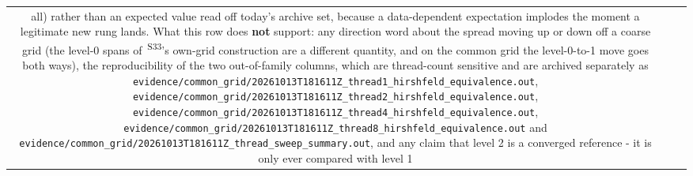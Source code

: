 \documentclass[11pt]{article}
\newcommand{\prov}[1]{\textsuperscript{\,#1}}
\begin{document}
\begin{longtable}{c>{\raggedright\arraybackslash}p{}>{\raggedright\arraybackslash}p{}}
all) rather than an expected value read off today's archive set, because a data-dependent expectation implodes the moment a legitimate new rung lands. What this row does \textbf{not} support: any direction word about the spread moving up or down off a coarse grid (the level-0 spans of \prov{S33}'s own-grid construction are a different quantity, and on the common grid the level-0-to-1 move goes both ways), the reproducibility of the two out-of-family columns, which are thread-count sensitive and are archived separately as \texttt{evidence/\allowbreak{}common\_\allowbreak{}grid/\allowbreak{}20261013T181611Z\_\allowbreak{}thread1\_\allowbreak{}hirshfeld\_\allowbreak{}equivalence.out}, \texttt{evidence/\allowbreak{}common\_\allowbreak{}grid/\allowbreak{}20261013T181611Z\_\allowbreak{}thread2\_\allowbreak{}hirshfeld\_\allowbreak{}equivalence.out}, \texttt{evidence/\allowbreak{}common\_\allowbreak{}grid/\allowbreak{}20261013T181611Z\_\allowbreak{}thread4\_\allowbreak{}hirshfeld\_\allowbreak{}equivalence.out}, \texttt{evidence/\allowbreak{}common\_\allowbreak{}grid/\allowbreak{}20261013T181611Z\_\allowbreak{}thread8\_\allowbreak{}hirshfeld\_\allowbreak{}equivalence.out} and \texttt{evidence/\allowbreak{}common\_\allowbreak{}grid/\allowbreak{}20261013T181611Z\_\allowbreak{}thread\_\allowbreak{}sweep\_\allowbreak{}summary.out}, and any claim that level 2 is a converged reference - it is only ever compared with level 1 \\

\end{longtable}
\end{document}
